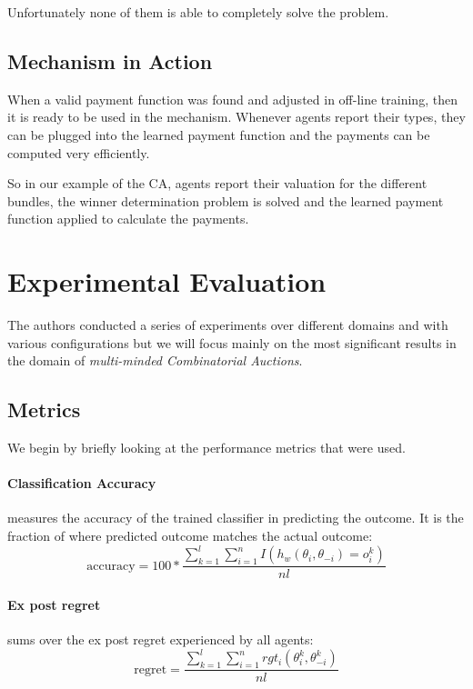\documentclass[]{article}
\begin{document}
\noindent Unfortunately none of them is able to completely solve the problem.

\subsection{Mechanism in Action}
When a valid payment function was found and adjusted in off-line training, then it is ready to be used in the mechanism. Whenever agents report their types, they can be plugged into the learned payment function and the payments can be computed very efficiently. 
 
\noindent So in our example of the CA, agents report their valuation for the different bundles, the winner determination problem is solved and the learned payment function applied to calculate the payments.

\section{Experimental Evaluation}
The authors conducted a series of experiments over different domains and with various configurations but we will focus mainly on the most significant results in the domain of \emph{multi-minded Combinatorial Auctions}.

\subsection{Metrics}
We begin by briefly looking at the performance metrics that were used. 

\paragraph{Classification Accuracy} measures the accuracy of the trained classifier in predicting the outcome. It is the fraction of where predicted outcome matches the actual outcome:
\begin{equation*}
\text{accuracy} = 100 * \frac{\sum_{k=1}^{l}\sum_{i=1}^{n}I(h_{w}(\theta_{i},\theta_{-i})=o_{i}^{k})}{nl}
\end{equation*}

\paragraph{Ex post regret} sums over the ex post regret experienced by all agents:
\begin{equation*}
\text{regret} = \frac{\sum_{k=1}^{l}\sum_{i=1}^{n}rgt_{i}(\theta_{i}^{k}, \theta_{-i}^{k})}{nl}
\end{equation*}
\end{document}
